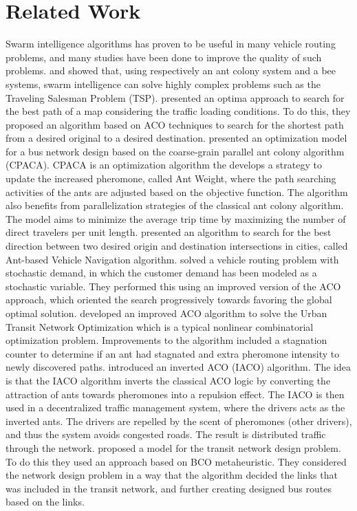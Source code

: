 \section{Related Work}


Swarm intelligence algorithms has proven to be useful in many vehicle routing problems, and many studies have been done to improve the quality of such problems. \citet{dorigo97} and \citet{lucic03} showed that, using respectively an ant colony system and a bee systems, swarm intelligence can solve highly complex problems such as the Traveling Salesman Problem (TSP). \citet{hsiao04} presented an optima approach to search for the best path of a map considering the traffic loading conditions. To do this, they proposed an algorithm based on ACO techniques to search for the shortest path from a desired original to a desired destination. \citet{yang07} presented an optimization model for a bus network design based on the coarse-grain parallel ant colony algorithm (CPACA). CPACA is an optimization algorithm the develops a strategy to update the increased pheromone, called Ant Weight, where the path searching activities of the ants are adjusted based on the objective function. The algorithm also benefits from parallelization strategies of the classical ant colony algorithm. The model aims to minimize the average trip time by maximizing the number of direct travelers per unit length. \citet{salehi-nezhad07} presented an algorithm to search for the best direction between two desired origin and destination intersections in cities, called Ant-based Vehicle Navigation algorithm. \citet{tripathi09} solved a vehicle routing problem with stochastic demand, in which the customer demand has been modeled as a stochastic variable. They performed this using an improved version of the ACO approach, which oriented the search progressively towards favoring the global optimal solution. \citet{jiang10} developed an improved ACO algorithm to solve the Urban Transit Network Optimization which is a typical nonlinear combinatorial optimization problem. Improvements to the algorithm included a stagnation counter to determine if an ant had stagnated and extra pheromone intensity to newly discovered paths. \citet{dias14} introduced an inverted ACO (IACO) algorithm. The idea is that the IACO algorithm inverts the classical ACO logic by converting the attraction of ants towards pheromones into a repulsion effect. The IACO is then used in a decentralized traffic management system, where the drivers acts as the inverted ants. The drivers are repelled by the scent of pheromones (other drivers), and thus the system avoids congested roads. The result is distributed traffic through the network. \citet{nikolic14} proposed a model for the transit network design problem. To do this they used an approach based on BCO metaheuristic. They considered the network design problem in a way that the algorithm decided the links that was included in the transit network, and further creating designed bus routes based on the links. 

